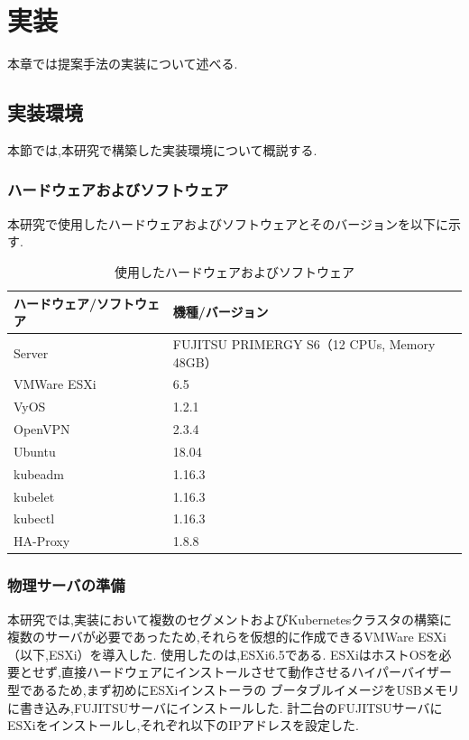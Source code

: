 \chapter{実装}
\label{implementation}

本章では提案手法の実装について述べる.

\section{実装環境}
\label{implementation:environment}

本節では,本研究で構築した実装環境について概説する.

\subsection{ハードウェアおよびソフトウェア}
\label{implementation:environment:resouces}

本研究で使用したハードウェアおよびソフトウェアとそのバージョンを以下に示す.

\begin{table}[htb]
  \begin{center}
    \caption{使用したハードウェアおよびソフトウェア}
    \begin{tabular}{|l|l|} \hline
      ハードウェア/ソフトウェア & 機種/バージョン \\ \hline
      Server & FUJITSU PRIMERGY S6（12 CPUs, Memory 48GB） \\ \hline
      VMWare ESXi & 6.5 \\ \hline
      VyOS & 1.2.1 \\ \hline
      OpenVPN & 2.3.4 \\ \hline
      Ubuntu & 18.04 \\ \hline
      kubeadm & 1.16.3 \\ \hline
      kubelet & 1.16.3 \\ \hline
      kubectl & 1.16.3 \\ \hline
      HA-Proxy & 1.8.8 \\ \hline
    \end{tabular}
  \end{center}
\end{table}

\subsection{物理サーバの準備}
\label{implementation:esxi}

本研究では,実装において複数のセグメントおよびKubernetesクラスタの構築に複数のサーバが必要であったため,それらを仮想的に作成できるVMWare ESXi（以下,ESXi）を導入した.
使用したのは,ESXi6.5である.
ESXiはホストOSを必要とせず,直接ハードウェアにインストールさせて動作させるハイパーバイザー型であるため,まず初めにESXiインストーラの
ブータブルイメージをUSBメモリに書き込み,FUJITSUサーバにインストールした.
計二台のFUJITSUサーバにESXiをインストールし,それぞれ以下のIPアドレスを設定した.

